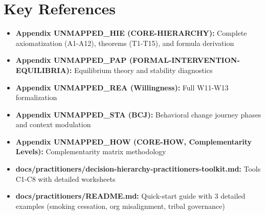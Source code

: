 \documentclass[11pt, a4paper]{article}
\begin{document}
\section*{Key References}

\begin{itemize}[nosep]
    \item \textbf{Appendix UNMAPPED_HIE (CORE-HIERARCHY):} Complete axiomatization (A1-A12), theorems (T1-T15), and formula derivation
    \item \textbf{Appendix UNMAPPED_PAP (FORMAL-INTERVENTION-EQUILIBRIA):} Equilibrium theory and stability diagnostics
    \item \textbf{Appendix UNMAPPED_REA (Willingness):} Full W11-W13 formalization
    \item \textbf{Appendix UNMAPPED_STA (BCJ):} Behavioral change journey phases and context modulation
    \item \textbf{Appendix UNMAPPED_HOW (CORE-HOW, Complementarity Levels):} Complementarity matrix methodology
    \item \textbf{docs/practitioners/decision-hierarchy-practitioners-toolkit.md:} Tools C1-C8 with detailed worksheets
    \item \textbf{docs/practitioners/README.md:} Quick-start guide with 3 detailed examples (smoking cessation, org misalignment, tribal governance)
\end{itemize}
\end{document}
